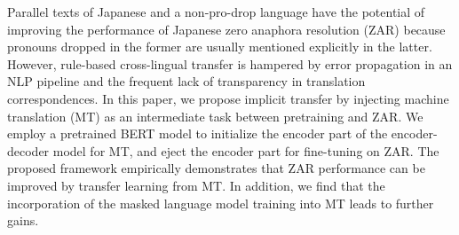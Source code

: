 Parallel texts of Japanese and a non-pro-drop language have the potential of improving the performance of Japanese zero anaphora resolution (ZAR) because pronouns dropped in the former are usually mentioned explicitly in the latter. However, rule-based cross-lingual transfer is hampered by error propagation in an NLP pipeline and the frequent lack of transparency in translation correspondences. In this paper, we propose implicit transfer by injecting machine translation (MT) as an intermediate task between pretraining and ZAR. We employ a pretrained BERT model to initialize the encoder part of the encoder-decoder model for MT, and eject the encoder part for fine-tuning on ZAR. The proposed framework empirically demonstrates that ZAR performance can be improved by transfer learning from MT. In addition, we find that the incorporation of the masked language model training into MT leads to further gains.
